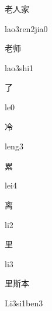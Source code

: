 \begin{multicols*}{2}
\begin{verbete}{老人家}
\begin{pronuncia}{lao3ren2jia0}
\end{pronuncia}
\end{verbete}

\begin{verbete}{老师}
\begin{pronuncia}{lao3shi1}
\end{pronuncia}
\end{verbete}

\begin{verbete}[le0]{了}
\begin{pronuncia}{le0}
\end{pronuncia}
\end{verbete}

\begin{verbete}[leng3]{冷}
\begin{pronuncia}{leng3}
\end{pronuncia}
\end{verbete}

\begin{verbete}[lei4]{累}
\begin{pronuncia}{lei4}
\end{pronuncia}
\end{verbete}

\begin{verbete}[li2]{离}
\begin{pronuncia}{li2}
\end{pronuncia}
\end{verbete}

\begin{verbete}[li3]{里}
\begin{pronuncia}{li3}
\end{pronuncia}
\end{verbete}

\begin{verbete}[Li3si1ben3]{里斯本}
\begin{pronuncia}{Li3si1ben3}
\end{pronuncia}
\end{verbete}


\end{multicols*}
